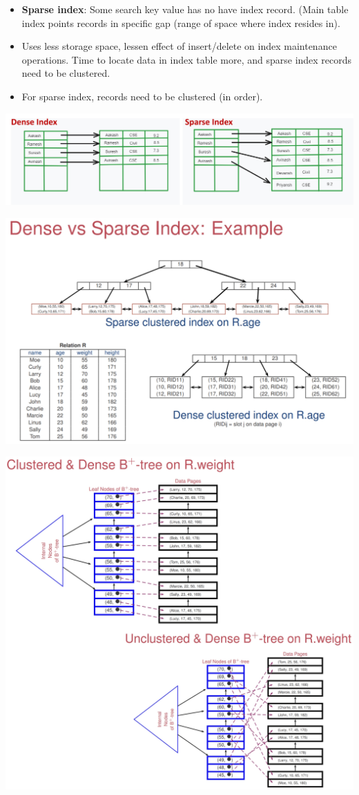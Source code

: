 \documentclass[10pt, landscape]{article}
\begin{document}
\begin{multicols*}{3}
\begin{itemize}
\item \textbf{Sparse index}: Some search key value has no have index record. (Main table index points records in specific gap (range of space where index resides in).
\item Uses less storage space, lessen effect of insert/delete on index maintenance operations. Time to locate data in index table more, and sparse index records need to be clustered.
\item For sparse index, records need to be clustered (in order).
\end{itemize}
\centerline{\includegraphics[width = 1\linewidth]{denseIndex}}
\medskip
\centerline{\includegraphics[width = 0.8\linewidth]{denseIndex2}}
\medskip
\centerline{\includegraphics[width = 0.8\linewidth]{clusteredIndex2}}


\end{multicols*}
\end{document}
